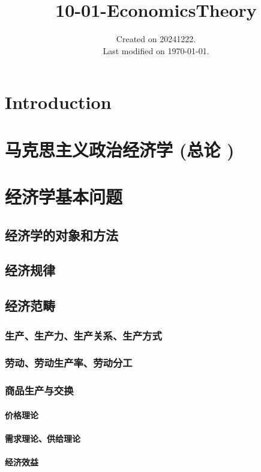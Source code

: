 \documentclass[UTF8]{../../RepresentationUniverse}
\begin{document}
\title{10-01-EconomicsTheory}
\date{Created on 20241222.\\   Last modified on \today.}
\maketitle
\tableofcontents


\chapter{Introduction}

 

\chapter{马克思主义政治经济学 (总论 )}


\chapter{经济学基本问题}
\section{经济学的对象和方法}
\section{经济规律}
\section{经济范畴}
    \subsection{生产、生产力、生产关系、生产方式}
    \subsection{劳动、劳动生产率、劳动分工}
    \subsection{商品生产与交换}
        \subsubsection{价格理论}
        \subsubsection{需求理论、供给理论}
        \subsubsection{经济效益}
\end{document}
